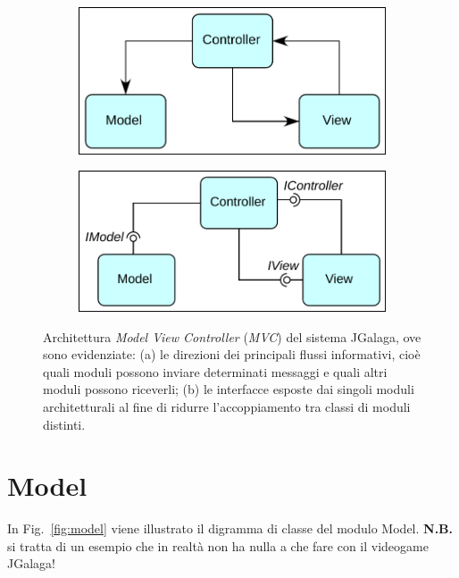 \documentclass[12pt,a4paper]{report}
\begin{document}
\begin{figure}[bt]
\begin{subfigure}{.49\textwidth}
  \centering
  \includegraphics[width=.94\linewidth]{mvc}
  \caption{}
  \label{fig:mvc}
\end{subfigure}%
\begin{subfigure}{.49\textwidth}
  \centering
  \includegraphics[width=.98\linewidth]{mvc-interfaces}
  \caption{}
  \label{fig:mvc-int}
\end{subfigure}%
\caption{Architettura  \emph{Model View Controller} (\emph{MVC}) del sistema JGalaga, ove sono evidenziate: (a) le direzioni dei principali flussi informativi, cio\`e quali moduli possono inviare determinati messaggi e quali altri moduli possono riceverli; (b) le interfacce esposte dai singoli moduli architetturali al fine di ridurre l'accoppiamento tra classi di moduli distinti.}
\label{fig:arch}
\end{figure}

\lipsum[10 -11]

\section{Model}\label{se:arch.model}
\lipsum[12]
In Fig.~\ref{fig:model} viene illustrato il digramma di classe del modulo Model.\newline
\textbf{N.B.} si tratta di un esempio che in realtà non ha nulla a che fare con il videogame JGalaga!
\end{document}
